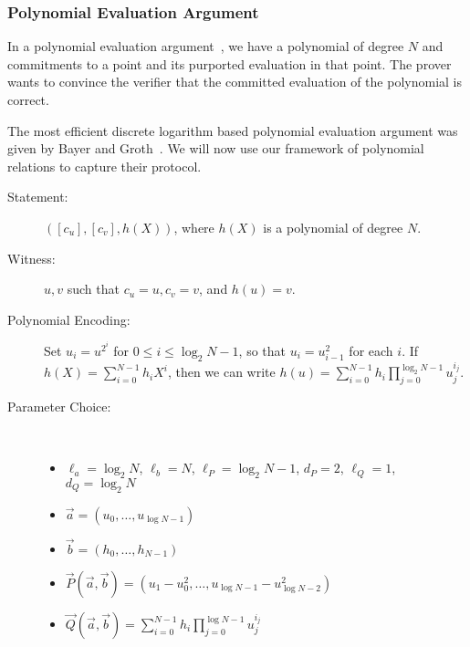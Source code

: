 \subsubsection{Polynomial Evaluation Argument}\label{app:poly}
In a polynomial evaluation argument~\cite{FO97,BDD07}, we have a polynomial of degree $N$ and commitments to a point and its purported evaluation in that point. The prover wants to convince the verifier that the committed evaluation of the polynomial is correct. 

The most efficient discrete logarithm based polynomial evaluation argument was given by Bayer and Groth~\cite{BayerG13}. We will now use our framework of polynomial relations to capture their protocol.
\begin{description}
\item[ Statement: ] $([c_u],[c_v],h(X))$, where $h(X)$ is a polynomial of degree $N$.
\item[ Witness: ] $u,v$ such that $c_u = u, c_v = v$, and $h(u) = v$.
\item[ Polynomial Encoding: ] Set $u_i = u^{2^i}$ for $0 \leq i \leq \log_2 N - 1$, so that $u_i = u_{i-1}^2$ for each $i$. If $h(X) = \sum_{i=0}^{N-1} h_i X^i$, then we can write $h(u) = \sum_{i=0}^{N-1} h_i \prod_{j=0}^{\log_2 N - 1} u_j^{i_j}$.
\item[ Parameter Choice: ] \ 
\begin{itemize}
\item $\ell_a=\log_2 N$, $\ell_b=N$, $\ell_P=\log_2 N-1$, $d_P=2$, $\ell_Q=1$, $d_Q=\log_2 N$
\item $\vec{a} = (u_0,\ldots,u_{\log N-1})$
\item $\vec{b} = (h_0,\ldots,h_{N-1})$
\item $\vec{P}(\vec{a},\vec{b}) = (u_1 - u_0^2, \ldots, u_{\log N-1} - u_{\log N-2}^2)$
\item $\vec{Q}(\vec{a},\vec{b}) = \sum_{i=0}^{N-1} h_{i} \prod_{j=0}^{\log N-1} u_j^{i_j}$
\end{itemize}
\end{description}

